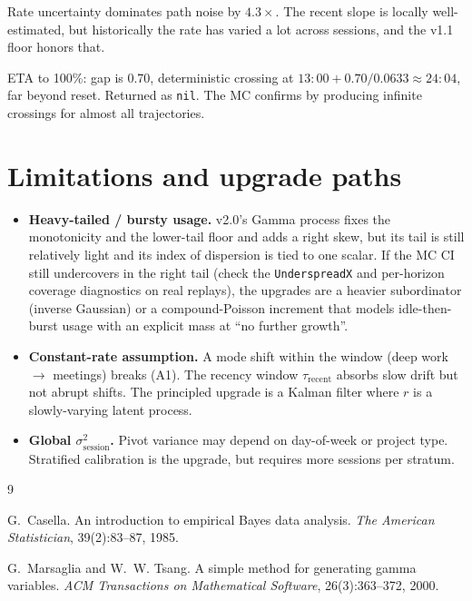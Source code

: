 \documentclass[11pt]{article}
\newcommand{\sigsessionsq}{\sigma_{\text{session}}^2}
\newcommand{\taurecent}{\tau_{\text{recent}}}
\begin{document}
Rate uncertainty dominates path noise by $4.3\times$. The recent slope is
locally well-estimated, but historically the rate has varied a lot across
sessions, and the v1.1 floor honors that.

ETA to 100\%: gap is 0.70, deterministic crossing at $13{:}00 +
0.70/0.0633 \approx 24{:}04$, far beyond reset. Returned as \texttt{nil}.
The MC confirms by producing infinite crossings for almost all
trajectories.

\section{Limitations and upgrade paths}

\begin{itemize}
  \item \textbf{Heavy-tailed / bursty usage.} v2.0's Gamma process fixes the
    monotonicity and the lower-tail floor and adds a right skew, but its tail
    is still relatively light and its index of dispersion is tied to one
    scalar. If the MC CI still undercovers in the right tail (check the
    \texttt{UnderspreadX} and per-horizon coverage diagnostics on real
    replays), the upgrades are a heavier subordinator (inverse Gaussian) or a
    compound-Poisson increment that models idle-then-burst usage with an
    explicit mass at ``no further growth''.
  \item \textbf{Constant-rate assumption.} A mode shift within the window
    (deep work $\to$ meetings) breaks (A1). The recency window $\taurecent$
    absorbs slow drift but not abrupt shifts. The principled upgrade is a
    Kalman filter where $r$ is a slowly-varying latent process.
  \item \textbf{Global $\sigsessionsq$.} Pivot variance may depend on
    day-of-week or project type. Stratified calibration is the upgrade, but
    requires more sessions per stratum.
\end{itemize}

\begin{thebibliography}{9}

G.~Casella.
\newblock An introduction to empirical Bayes data analysis.
\newblock \emph{The American Statistician}, 39(2):83--87, 1985.

G.~Marsaglia and W.~W. Tsang.
\newblock A simple method for generating gamma variables.
\newblock \emph{ACM Transactions on Mathematical Software}, 26(3):363--372, 2000.

\end{thebibliography}
\end{document}
